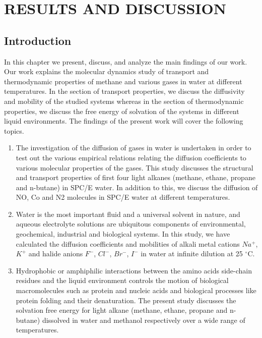 \chapter{{RESULTS AND DISCUSSION}} \label{chap:4}
\section{Introduction}
In this chapter we present, discuss, and analyze the main findings of our work. Our work explains  the molecular dynamics study of transport and thermodynamic properties of methane and various gases in water at different temperatures. In the section of  transport properties,  we discuss  the diffusivity and mobility of the studied systems whereas in the section of  thermodynamic properties, we discuss the free energy of solvation of the systems in different liquid environments. The findings of the present work will cover the following topics.

\begin{enumerate}
 \item  The investigation of the diffusion of gases  in water is undertaken in order to test  out the various empirical relations  relating the diffusion coefficients to various molecular properties of the gases. This study discusses the structural and transport properties of first four light alkanes (methane, ethane, propane and n-butane) in SPC/E water. In addition to this, we discuss the diffusion of NO, Co and N2 molecules in SPC/E water at different temperatures.  
  
  \item Water is the most important fluid and a universal solvent  in nature, and aqueous electrolyte solutions  are ubiquitous components of environmental, geochemical, industrial and biological systems.  In this study, we  have calculated the diffusion coefficients  and mobilities of alkali metal cations $Na^{+}$, $K^{+}$ and halide anions $F^{-}$, $Cl^{-}$, $Br^{-}$, $I^{-}$ in  water at infinite dilution  at 25 $^{\circ}$C. 
  
  \item  Hydrophobic or amphiphilic interactions between the amino acids side-chain residues and the liquid  environment controls the motion of biological macromolecules such as protein and nucleic acids and biological processes like protein folding and their denaturation. The  present study discusses the solvation free  energy for light alkane (methane, ethane, propane and n-butane) dissolved in water and methanol  respectively over a wide range of temperatures.
\end{enumerate} 

